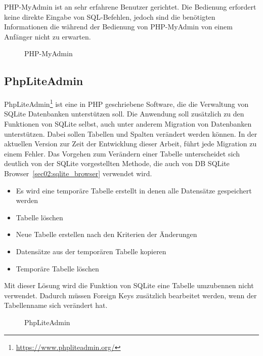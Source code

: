 PHP-MyAdmin ist an sehr erfahrene Benutzer gerichtet. Die Bedienung erfordert keine direkte Eingabe von SQL-Befehlen, jedoch sind die benötigten Informationen die während der Bedienung von PHP-MyAdmin von einem Anfänger nicht zu erwarten.
\begin{figure}[ht]
        \centering
        \caption{PHP-MyAdmin}
        \label{pic:php_myadmin}
\end{figure}


\subsection{PhpLiteAdmin}
\label{sec02:phpliteadmin} 
PhpLiteAdmin\footnote{\url{https://www.phpliteadmin.org/}} ist eine in PHP geschriebene Software, die die Verwaltung von SQLite Datenbanken unterstützen soll. Die Anwendung soll zusätzlich zu den Funktionen von SQLite selbst, auch unter anderem Migration von Datenbanken unterstützen. Dabei sollen Tabellen und Spalten verändert werden können. 
In der aktuellen Version zur Zeit der Entwicklung dieser Arbeit, führt jede Migration zu einem Fehler. Das Vorgehen zum Verändern einer Tabelle unterscheidet sich deutlich von der SQLite vorgestellten Methode, die auch von DB SQLite Browser~\ref{sec02:sqlite_browser} verwendet wird. 
\begin{itemize}
    \item Es wird eine temporäre Tabelle erstellt in denen alle Datensätze gespeichert werden
    \item Tabelle löschen
    \item Neue Tabelle erstellen nach den Kriterien der Änderungen
    \item Datensätze aus der temporären Tabelle kopieren
    \item Temporäre Tabelle löschen
\end{itemize}
Mit dieser Lösung wird die Funktion von SQLite eine Tabelle umzubennen nicht verwendet. 
Dadurch müssen Foreign Keys zusätzlich bearbeitet werden, wenn der Tabellenname sich verändert hat.

\begin{figure}[ht]
        \centering
        \caption{PhpLiteAdmin}
        \label{pic:phpliteAdmin}
\end{figure}